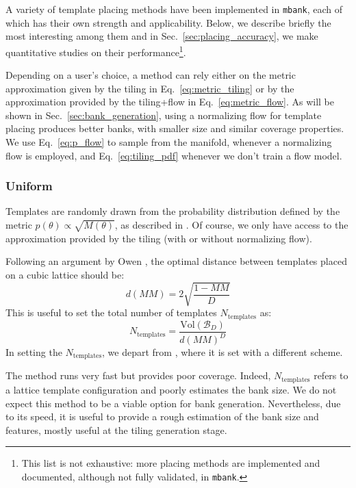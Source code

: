 \documentclass[twocolumn,showpacs,preprintnumbers,nofootinbib,prd,
superscriptaddress,10pt]{revtex4-2}
\begin{document}
A variety of template placing methods have been implemented in \texttt{mbank}, each of which has their own strength and applicability.
Below, we describe briefly the most interesting among them and in Sec.~\ref{sec:placing_accuracy}, we make quantitative studies on their performance\footnote{
This list is not exhaustive: more placing methods are implemented and documented, although not fully validated, in \texttt{mbank}.}.

Depending on a user's choice, a method can rely either on the metric approximation given by the tiling in Eq.~\eqref{eq:metric_tiling} or by the approximation provided by the tiling+flow in Eq.~\eqref{eq:metric_flow}.
As will be shown in Sec.~\ref{sec:bank_generation}, using a normalizing flow for template placing produces better banks, with smaller size and similar coverage properties.
We use Eq.~\eqref{eq:p_flow} to sample from the manifold, whenever a normalizing flow is employed, and Eq.~\eqref{eq:tiling_pdf} whenever we don't train a flow model.

\subsubsection{Uniform}\label{par:uniform}
Templates are randomly drawn from the probability distribution defined by the metric $p(\theta) \propto \sqrt{M(\theta)}$, as described in \cite{Messenger:2008ta}.
Of course, we only have access to the approximation provided by the tiling (with or without normalizing flow).

Following an argument by Owen \cite{owen_metric}, the optimal distance between templates placed on a cubic lattice should be:
\begin{equation}
	d(MM) = 2 \sqrt{\frac{1-MM}{D}}
\end{equation}
This is useful to set the total number of templates $N_\mathrm{templates}$ as:
\begin{equation} \label{eq:N_templates}
	N_{\text{templates}} = \frac{\text{Vol}(\mathcal{B}_D)}{d(MM)^D}
\end{equation}
In setting the $N_{\text{templates}}$, we depart from \cite{Messenger:2008ta}, where it is set with a different scheme.

The method runs very fast but provides poor coverage. Indeed, $N_{\text{templates}}$ refers to a lattice template configuration and poorly estimates the bank size. We do not expect this method to be a viable option for bank generation.
Nevertheless, due to its speed, it is useful to provide a rough estimation of the bank size and features, mostly useful at the tiling generation stage.
\end{document}
